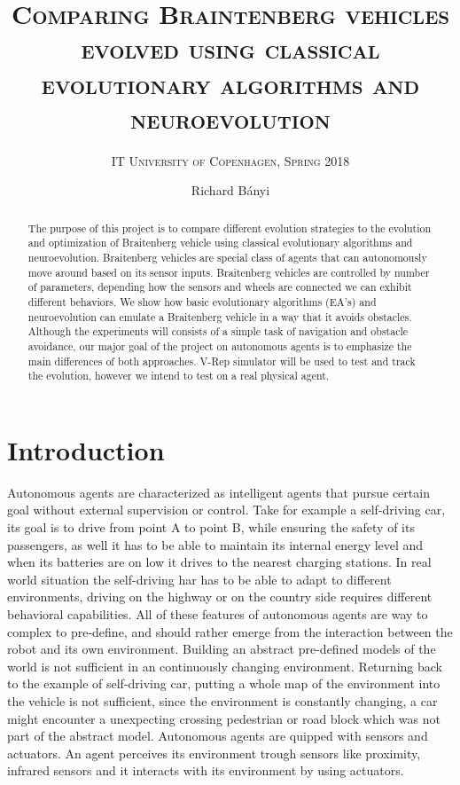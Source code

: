 \documentclass[format=acmsmall, review=false, screen=true]{acmart}
\author{Richard Bányi}
\title{\textsc{Comparing Braintenberg vehicles evolved using classical evolutionary algorithms and neuroevolution}}
\subtitle{\textsc{IT University of Copenhagen, Spring 2018}}
\begin{document}
\begin{abstract}
The purpose of this project is to compare different evolution strategies to the evolution and optimization of Braitenberg vehicle using classical evolutionary algorithms and neuroevolution. Braitenberg vehicles are special class of agents that can autonomously move around based on its sensor inputs. Braitenberg vehicles are controlled by number of parameters, depending how the sensors and wheels are connected we can exhibit different behaviors. We show how basic evolutionary algorithms (EA’s) and neuroevolution can emulate a Braitenberg vehicle in a way that it avoids obstacles. Although the experiments will consists of a simple task of navigation and obstacle avoidance, our major goal of the project on autonomous agents is to emphasize the main differences  of both approaches. V-Rep simulator will be used to test and track the evolution, however we intend to test on a real physical agent.
	\end{abstract}
\maketitle


\section{Introduction}

Autonomous agents are characterized as intelligent agents that pursue certain goal without external supervision or control. Take for example a self-driving car\cite{eberhard200621}, its goal is to drive from point A to point B, while ensuring the safety of its passengers, as well it has to be able to maintain its internal energy level and when its batteries are on low it drives to the nearest charging stations. In real world situation the self-driving har has to be able to adapt to different environments, driving on the highway or on the country side requires different behavioral capabilities. All of these features of autonomous agents are way to complex to pre-define, and should rather emerge from the interaction between the robot and its own environment. Building an abstract pre-defined models of the world is not sufficient in an continuously changing environment. Returning back to the example of self-driving car, putting a whole map of the environment into the vehicle is not sufficient, since the environment is constantly changing, a car might encounter a unexpecting crossing pedestrian or road block which was not part of the abstract model. Autonomous agents are quipped with sensors and actuators. An agent perceives its environment trough sensors like proximity, infrared sensors and it interacts with its environment by using actuators. 
\end{document}
